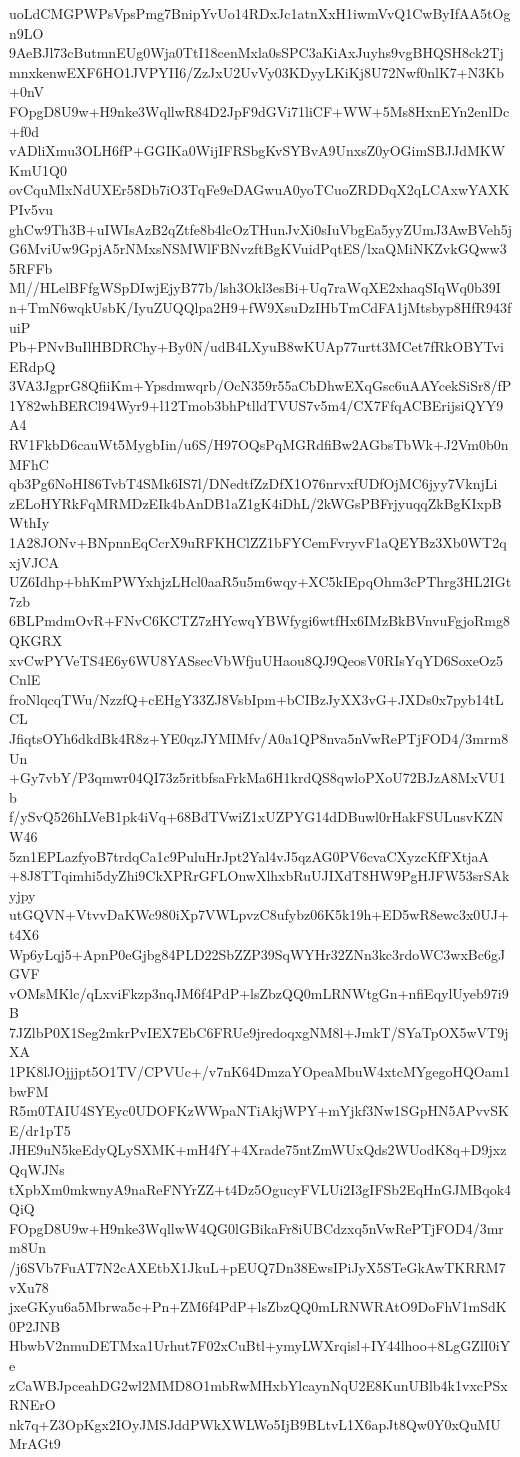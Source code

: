 uoLdCMGPWPsVpsPmg7BnipYvUo14RDxJc1atnXxH1iwmVvQ1CwByIfAA5tOgn9LO
9AeBJl73cButmnEUg0Wja0TtI18cenMxla0sSPC3aKiAxJuyhs9vgBHQSH8ck2Tj
mnxkenwEXF6HO1JVPYII6/ZzJxU2UvVy03KDyyLKiKj8U72Nwf0nlK7+N3Kb+0nV
FOpgD8U9w+H9nke3WqllwR84D2JpF9dGVi71liCF+WW+5Ms8HxnEYn2enlDc+f0d
vADliXmu3OLH6fP+GGIKa0WijIFRSbgKvSYBvA9UnxsZ0yOGimSBJJdMKWKmU1Q0
ovCquMlxNdUXEr58Db7iO3TqFe9eDAGwuA0yoTCuoZRDDqX2qLCAxwYAXKPIv5vu
ghCw9Th3B+uIWIsAzB2qZtfe8b4lcOzTHunJvXi0sIuVbgEa5yyZUmJ3AwBVeh5j
G6MviUw9GpjA5rNMxsNSMWlFBNvzftBgKVuidPqtES/lxaQMiNKZvkGQww35RFFb
Ml//HLelBFfgWSpDIwjEjyB77b/lsh3Okl3esBi+Uq7raWqXE2xhaqSIqWq0b39I
n+TmN6wqkUsbK/IyuZUQQlpa2H9+fW9XsuDzIHbTmCdFA1jMtsbyp8HfR943fuiP
Pb+PNvBuIlHBDRChy+By0N/udB4LXyuB8wKUAp77urtt3MCet7fRkOBYTviERdpQ
3VA3JgprG8QfiiKm+Ypsdmwqrb/OcN359r55aCbDhwEXqGsc6uAAYcekSiSr8/fP
1Y82whBERCl94Wyr9+l12Tmob3bhPtlldTVUS7v5m4/CX7FfqACBErijsiQYY9A4
RV1FkbD6cauWt5MygbIin/u6S/H97OQsPqMGRdfiBw2AGbsTbWk+J2Vm0b0nMFhC
qb3Pg6NoHI86TvbT4SMk6IS7l/DNedtfZzDfX1O76nrvxfUDfOjMC6jyy7VknjLi
zELoHYRkFqMRMDzEIk4bAnDB1aZ1gK4iDhL/2kWGsPBFrjyuqqZkBgKIxpBWthIy
1A28JONv+BNpnnEqCcrX9uRFKHClZZ1bFYCemFvryvF1aQEYBz3Xb0WT2qxjVJCA
UZ6Idhp+bhKmPWYxhjzLHcl0aaR5u5m6wqy+XC5kIEpqOhm3cPThrg3HL2IGt7zb
6BLPmdmOvR+FNvC6KCTZ7zHYcwqYBWfygi6wtfHx6IMzBkBVnvuFgjoRmg8QKGRX
xvCwPYVeTS4E6y6WU8YASsecVbWfjuUHaou8QJ9QeosV0RIsYqYD6SoxeOz5CnlE
froNlqcqTWu/NzzfQ+cEHgY33ZJ8VsbIpm+bCIBzJyXX3vG+JXDs0x7pyb14tLCL
JfiqtsOYh6dkdBk4R8z+YE0qzJYMIMfv/A0a1QP8nva5nVwRePTjFOD4/3mrm8Un
+Gy7vbY/P3qmwr04QI73z5ritbfsaFrkMa6H1krdQS8qwloPXoU72BJzA8MxVU1b
f/ySvQ526hLVeB1pk4iVq+68BdTVwiZ1xUZPYG14dDBuwl0rHakFSULusvKZNW46
5zn1EPLazfyoB7trdqCa1c9PuluHrJpt2Yal4vJ5qzAG0PV6cvaCXyzcKfFXtjaA
+8J8TTqimhi5dyZhi9CkXPRrGFLOnwXlhxbRuUJIXdT8HW9PgHJFW53srSAkyjpy
utGQVN+VtvvDaKWc980iXp7VWLpvzC8ufybz06K5k19h+ED5wR8ewc3x0UJ+t4X6
Wp6yLqj5+ApnP0eGjbg84PLD22SbZZP39SqWYHr32ZNn3kc3rdoWC3wxBc6gJGVF
vOMsMKlc/qLxviFkzp3nqJM6f4PdP+lsZbzQQ0mLRNWtgGn+nfiEqylUyeb97i9B
7JZlbP0X1Seg2mkrPvIEX7EbC6FRUe9jredoqxgNM8l+JmkT/SYaTpOX5wVT9jXA
1PK8lJOjjjpt5O1TV/CPVUc+/v7nK64DmzaYOpeaMbuW4xtcMYgegoHQOam1bwFM
R5m0TAIU4SYEyc0UDOFKzWWpaNTiAkjWPY+mYjkf3Nw1SGpHN5APvvSKE/dr1pT5
JHE9uN5keEdyQLySXMK+mH4fY+4Xrade75ntZmWUxQds2WUodK8q+D9jxzQqWJNs
tXpbXm0mkwnyA9naReFNYrZZ+t4Dz5OgucyFVLUi2I3gIFSb2EqHnGJMBqok4QiQ
FOpgD8U9w+H9nke3WqllwW4QG0lGBikaFr8iUBCdzxq5nVwRePTjFOD4/3mrm8Un
/j6SVb7FuAT7N2cAXEtbX1JkuL+pEUQ7Dn38EwsIPiJyX5STeGkAwTKRRM7vXu78
jxeGKyu6a5Mbrwa5c+Pn+ZM6f4PdP+lsZbzQQ0mLRNWRAtO9DoFhV1mSdK0P2JNB
HbwbV2nmuDETMxa1Urhut7F02xCuBtl+ymyLWXrqisl+IY44lhoo+8LgGZlI0iYe
zCaWBJpceahDG2wl2MMD8O1mbRwMHxbYlcaynNqU2E8KunUBlb4k1vxcPSxRNErO
nk7q+Z3OpKgx2IOyJMSJddPWkXWLWo5IjB9BLtvL1X6apJt8Qw0Y0xQuMUMrAGt9

